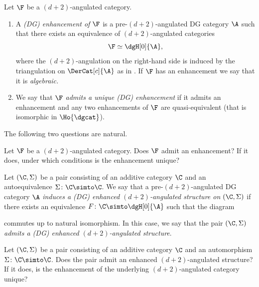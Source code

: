 \documentclass[a4paper]{amsart}
\begin{document}
\begin{definition}
  \label{def:DG_enhancement_d+2-angulated}
  Let $\F$ be a $(d+2)$-angulated category.
  \begin{enumerate}
  \item A \emph{(DG) enhancement of $\F$} is a pre-$(d+2)$-angulated DG category
    $\A$ such that there exists an equivalence of $(d+2)$-angulated categories
    \[
      \F\simeq\dgH[0]{\A},
    \]
    where the $(d+2)$-angulation on the right-hand side is induced by the
    triangulation on $\DerCat[c]{\A}$ as in . If $\F$ has an enhancement we say that it is \emph{algebraic.}
  \item\label{it:DG_enhancement_pre-d+2-ang_equivalence} We say that \emph{$\F$
      admits a unique (DG) enhancement} if it admits an enhancement and any two
    enhancements of $\F$ are quasi-equivalent (that is isomorphic in
    $\Ho{\dgcat}$).
  \end{enumerate}

\end{definition}

The following two questions are natural.

\begin{question}
  \label{question:one}
  Let $\F$ be a $(d+2)$-angulated category. Does $\F$ admit an enhancement? If
  it does, under which conditions is the enhancement unique?
\end{question}

\begin{definition}
  \label{def:enhanced_angulated_structure}
  Let $(\C,\Sigma)$ be a pair consisting of an additive category $\C$ and an
  autoequivalence $\Sigma\colon\C\simto\C$. We say that a pre-$(d+2)$-angulated
  DG category $\A$ \emph{induces a (DG) enhanced $(d+2)$-angulated structure on
    $(\C,\Sigma)$} if there exists an equivalence $F\colon\C\simto\dgH[0]{\A}$
  such that the diagram
  \begin{center}
  \end{center}
  commutes up to natural isomorphism. In this case, we say that the pair
  $(\C,\Sigma)$ \emph{admits a (DG) enhanced $(d+2)$-angulated structure}.
\end{definition}

\begin{question}
  \label{question:two}
  Let $(\C,\Sigma)$ be a pair consisting of an additive category $\C$ and an
  automorphism $\Sigma\colon\C\simto\C$. Does the pair admit an enhanced
  $(d+2)$-angulated structure? If it does, is the enhancement of the underlying
  $(d+2)$-angulated category unique?
\end{question}
\end{document}
